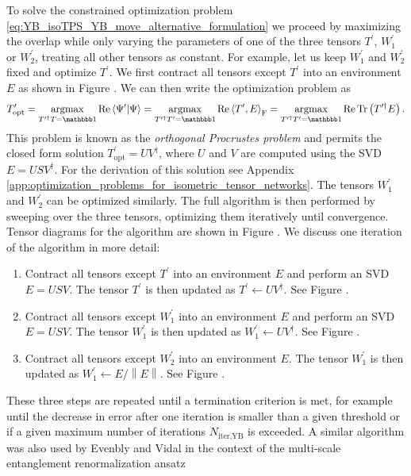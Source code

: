 To solve the constrained optimization problem \eqref{eq:YB_isoTPS_YB_move_alternative_formulation} we proceed by maximizing the overlap while only varying the parameters of one of the three tensors $T^\prime$, $W_1^\prime$ or $W_2^\prime$, treating all other tensors as constant. For example, let us keep $W_1^\prime$ and $W_2^\prime$ fixed and optimize $T^\prime$. We first contract all tensors except $T^\prime$ into an environment $E$ as shown in Figure . We can then write the optimization problem as
\begin{equation}
	T^\prime_\text{opt} = \underset{T^{\prime\dagger}T = \id}{\argmax} \Re\braket{\Psi^\prime|\Psi} = \underset{T^{\prime\dagger}T^\prime = \id}{\argmax}\Re\left\langle T^\prime, E\right\rangle_\text{F} = \underset{T^{\prime\dagger}T^\prime = \id}{\argmax}\Re\Tr\left(T^{\prime\dagger}E\right).
\end{equation}
This problem is known as the \textit{orthogonal Procrustes problem} and permits the closed form solution $T^\prime_\text{opt} = UV^\dagger$, where $U$ and $V$ are computed using the SVD $E = USV^\dagger$. For the derivation of this solution see Appendix \ref{app:optimization_problems_for_isometric_tensor_networks}. The tensors $W_1^\prime$ and $W_2^\prime$ can be optimized similarly. The full algorithm is then performed by sweeping over the three tensors, optimizing them iteratively until convergence. Tensor diagrams for the algorithm are shown in Figure . We discuss one iteration of the algorithm in more detail:
\begin{enumerate}
	\item Contract all tensors except $T^\prime$ into an environment $E$ and perform an SVD $E = USV$. The tensor $T^\prime$ is then updated as $T^\prime\leftarrow UV^\dagger$. See Figure .
	\item Contract all tensors except $W_1^\prime$ into an environment $E$ and perform an SVD $E = USV$. The tensor $W_1^\prime$ is then updated as $W_1^\prime\leftarrow UV^\dagger$. See Figure .
	\item Contract all tensors except $W_2^\prime$ into an environment $E$. The tensor $W_1^\prime$ is then updated as $W_1^\prime\leftarrow E/\left\lVert E\right\rVert$. See Figure .
\end{enumerate}
These three steps are repeated until a termination criterion is met, for example until the decrease in error after one iteration is smaller than a given threshold or if a given maximum number of iterations $N_\text{iter,YB}$ is exceeded. A similar algorithm was also used by Evenbly and Vidal in the context of the multi-scale entanglement renormalization ansatz
